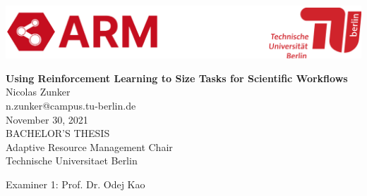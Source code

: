 
\thispagestyle{empty}

\includegraphics[width=\linewidth]{fig/Logo_Header}
\mbox{}\\[1pc]
\begin{center}
    \huge{ \bfseries Using Reinforcement Learning to Size Tasks for Scientific Workflows}\\[2pc]

    \Large{Nicolas Zunker}\\
    \large{n.zunker@campus.tu-berlin.de}\\[1pc]
    \large{November 30, 2021}\\[2pc]

    BACHELOR'S THESIS\\
    Adaptive Resource Management Chair\\
    Technische Universitaet Berlin
\end{center}
\vfill

Examiner 1: Prof. Dr. Odej Kao
\hfill{}\\

\afterpage{\null\thispagestyle{empty}\newpage}
